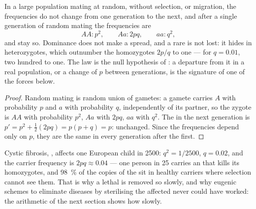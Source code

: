 \begin{theorem}\label{thm:b2:population-genetics:hw}
In a large population mating at random, without selection, 
or migration, the  frequencies do not change from one
generation to the next, and after a single generation of random
mating the  frequencies are
\[
AA : p^{2}, \qquad Aa : 2pq, \qquad aa : q^{2},
\]
and stay so. Dominance does not make a   spread, and
a rare   is not lost: it hides in heterozygotes,
which outnumber the homozygotes $2p/q$ to one --- for $q = 0.01$,
two hundred to one. The law is the null hypothesis of : a departure from it in a real population, or a change of
$p$ between generations, is the signature of one of the forces
below.
\end{theorem}
\begin{proof}
Random mating is random union of gametes: a gamete carries $A$ with
probability $p$ and $a$ with probability $q$, independently of its
partner, so the zygote is $AA$ with probability $p^{2}$, $Aa$ with
$2pq$, $aa$ with $q^{2}$. The  in the next
generation is $p' = p^{2} + \tfrac12(2pq) = p(p + q) = p$: unchanged.
Since the  frequencies depend only on $p$, they are the same
in every generation after the first.
\end{proof}

\begin{example}\label{ex:b2:population-genetics:cf}
Cystic fibrosis, , affects one European child in 2500:
$q^{2} = 1/2500$, $q = 0.02$, and the carrier frequency is $2pq
\approx 0.04$ --- one person in 25 carries an  that kills its
homozygotes, and \qty{98}{\%} of the copies of the  sit in
healthy carriers where selection cannot see them. That is why a
lethal  is removed so slowly, and why eugenic schemes to
eliminate  diseases by sterilising the affected never
could have worked: the arithmetic of the next section shows how
slowly.
\end{example}

